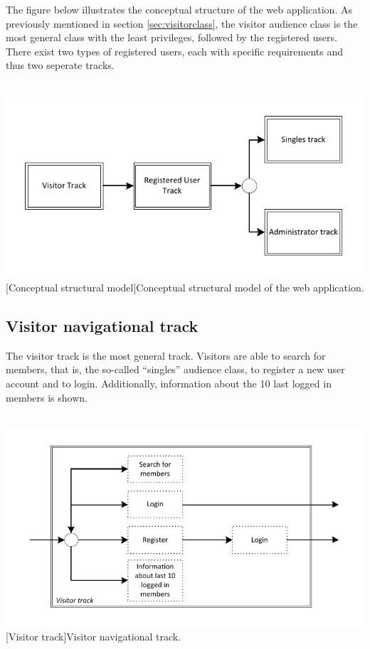 \documentclass[11pt, a4paper,svglistings,oneside]{book}
\begin{document}
The figure below illustrates the conceptual structure of the web application. As previously mentioned in section \ref{sec:visitorclass}, the visitor audience class is the most general class with the least privileges, followed by the registered users. There exist two types of registered users, each with specific requirements and thus two seperate tracks.
$\;$ \\ \\
\noindent\begin{minipage}{\textwidth}
    \centering
   \includegraphics[scale=1.3]{Nav_Concept.pdf}
 [Conceptual structural model]{Conceptual structural model of the web application.}
\end{minipage}


\subsection{Visitor navigational track}

The visitor track is the most general track. Visitors are able to search for members, that is, the so-called ``singles'' audience class, to register a new user account and to login. Additionally, information about the 10 last logged in members is shown.
$\;$ \\ \\
\noindent\begin{minipage}{\textwidth}
    \centering
   \includegraphics[scale=1.3]{Nav_Visitor_Track.pdf}
 [Visitor track]{Visitor navigational track.}
\end{minipage}
$\;$ \\ 
\end{document}
